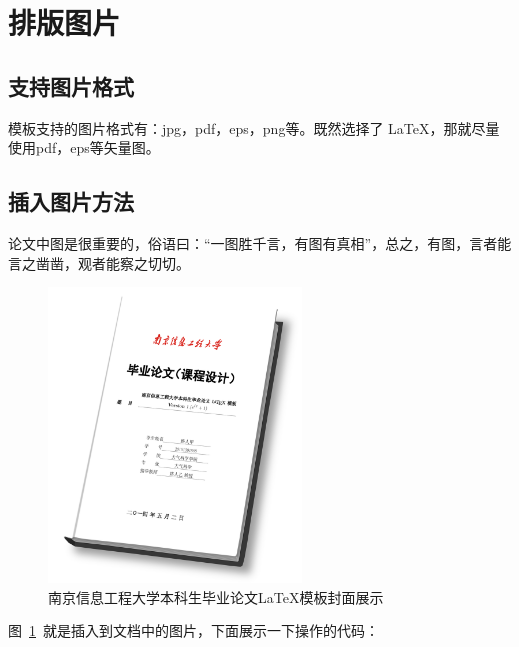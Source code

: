 \section{排版图片}

\subsection{支持图片格式}

模板支持的图片格式有：jpg，pdf，eps，png等。既然选择了 \LaTeX，那就尽量使用pdf，eps等矢量图。

\subsection{插入图片方法}

论文中图是很重要的，俗语曰：“一图胜千言，有图有真相”，总之，有图，言者能言之凿凿，观者能察之切切。

\begin{figure}[htbp]
    \centering
    \includegraphics[width=0.6\textwidth]{figs/color/face.png}
    \caption{南京信息工程大学本科生毕业论文\LaTeX 模板封面展示}
    \label{nuist_face}
\end{figure}

图~\ref{nuist_face}~就是插入到文档中的图片，下面展示一下操作的代码：

